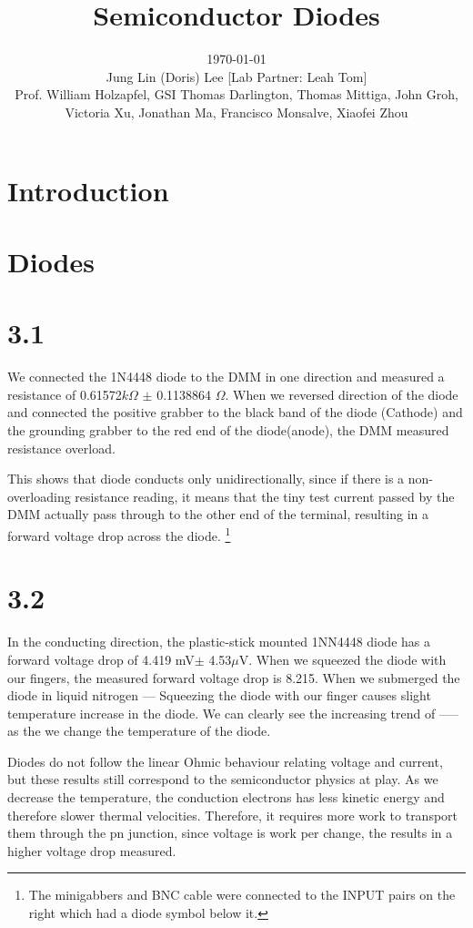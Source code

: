 \documentclass[authoryear, 12pt,5p, times]{elsarticle}
\begin{document}
\begin{frontmatter}
\title{Semiconductor Diodes}
\author{\today \quad \\Jung Lin (Doris) Lee [Lab Partner: Leah Tom]\\Prof. William Holzapfel, GSI Thomas Darlington, Thomas Mittiga, John Groh,  \\Victoria Xu, Jonathan Ma, Francisco Monsalve, Xiaofei Zhou}
	 
\end{frontmatter} 

\section*{Introduction\label{intro}}
\section{Diodes}
\section*{3.1}
We connected the 1N4448 diode to the DMM in one direction and measured a resistance of 0.61572$k\Omega$ $\pm$ 0.1138864 $\Omega$. When we reversed direction of the diode and connected the positive grabber to the black band of the diode (Cathode) and the grounding grabber to the red end of the diode(anode), the DMM measured resistance overload. 
\par This shows that diode conducts only unidirectionally, since if there is a non-overloading resistance reading, it means that the tiny test current passed by the DMM actually pass through to the other end of the terminal, resulting in a forward voltage drop across the diode.
\footnote{The minigabbers and BNC cable were connected to the INPUT pairs on the right which had a diode symbol below it.}
\section*{3.2}
In the conducting direction, the plastic-stick mounted 1NN4448 diode has a forward voltage drop of 4.419 mV$\pm$ 4.53$\mu$V.  When we squeezed the diode with our fingers, the measured forward voltage drop is 8.215.
When we submerged the diode in liquid nitrogen ---
Squeezing the diode with our finger causes slight temperature increase in the diode. We can clearly see the increasing trend of ----- as the we change the temperature of the diode.
\par Diodes do not follow the linear Ohmic behaviour relating voltage and current, but these results still correspond to the semiconductor physics at play. As we decrease the temperature, the conduction electrons has less kinetic energy and therefore slower thermal velocities. Therefore, it requires more work to transport them through the pn junction, since voltage is work per change, the results in a higher voltage drop measured. 
\end{document}
